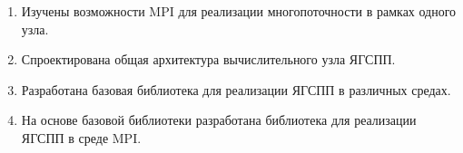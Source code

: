 \begin{enumerate}
	\item Изучены возможности MPI для реализации многопоточности в рамках одного узла.
	\item Спроектирована общая архитектура вычислительного узла ЯГСПП.
	\item Разработана базовая библиотека для реализации ЯГСПП в различных средах.
	\item На основе базовой библиотеки разработана библиотека для реализации ЯГСПП в среде MPI.
\end{enumerate}
